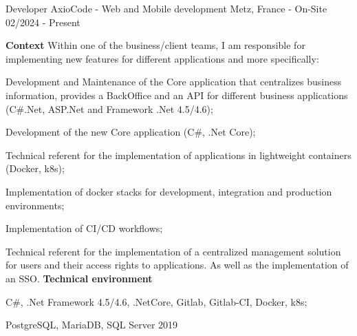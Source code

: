 

\begin{cventries}

  \cventry
    {Developer} %
    {AxioCode - Web and Mobile development} %
    {Metz, France - On-Site} %
    {02/2024 - Present} %
    {
      \textbf{Context}
      \newline
      Within one of the business/client teams, I am responsible for implementing new features for different applications and more specifically:
      \newline \vspace{12pt}
      \begin{cvitems} %
        \item {Development and Maintenance of the Core application that centralizes business information, provides a BackOffice and an API for different business applications (C\#.Net, ASP.Net and Framework .Net 4.5/4.6);}
        \item {Development of the new Core application (C\#, .Net Core);}
        \item {Technical referent for the implementation of applications in lightweight containers (Docker, k8s);}
        \item {Implementation of docker stacks for development, integration and production environments;}
        \item {Implementation of CI/CD workflows;}
      \end{cvitems}
      Technical referent for the implementation of a centralized management solution for users and their access rights to applications. As well as the implementation of an SSO. 
      \newline \vspace{4pt}
      \textbf{Technical environment}
      \newline \vspace{12pt}
      \begin{cvitems}
        \item {C\#, .Net Framework 4.5/4.6, .NetCore, Gitlab, Gitlab-CI, Docker, k8s;}
        \item {PostgreSQL, MariaDB, SQL Server 2019}
      \end{cvitems}
    }


\end{cventries}

